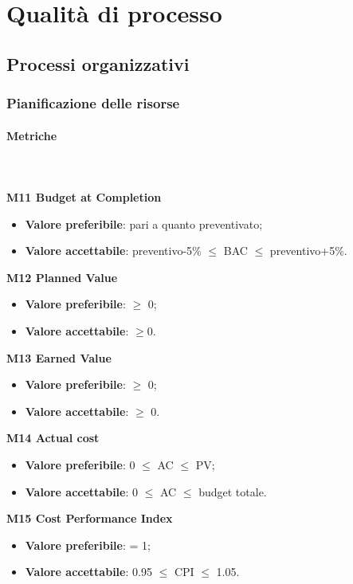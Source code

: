 \section{Qualità di processo}
	\subsection{Processi organizzativi}
		\subsubsection{Pianificazione delle risorse}
			\paragraph{Metriche} \mbox{} \\ \\
				\textbf{M11 Budget at Completion}
				\begin{itemize}
					\item \textbf{Valore preferibile}: pari a quanto preventivato;
					\item \textbf{Valore accettabile}: preventivo-5\% $\le$ BAC $\le$ preventivo+5\%.
				\end{itemize}
				\textbf{M12 Planned Value}
				\begin{itemize}
					\item \textbf{Valore preferibile}: $\ge$ 0;
					\item \textbf{Valore accettabile}: $\ge$0.
				\end{itemize}
				\textbf{M13 Earned Value}
				\begin{itemize}
					\item \textbf{Valore preferibile}: $\ge$ 0;
					\item \textbf{Valore accettabile}: $\ge$ 0.
				\end{itemize}
				\textbf{M14 Actual cost}
				\begin{itemize}
					\item \textbf{Valore preferibile}: 0 $\le$ AC $\le$ PV;
					\item \textbf{Valore accettabile}: 0 $\le$ AC $\le$ budget totale.
				\end{itemize}
				\textbf{M15 Cost Performance Index}
				\begin{itemize}
					\item \textbf{Valore preferibile}: = 1;
					\item \textbf{Valore accettabile}: 0.95 $\le$ CPI $\le$ 1.05.
				\end{itemize}

